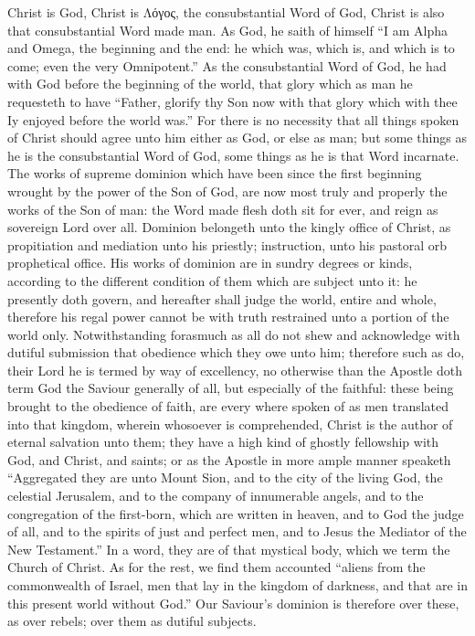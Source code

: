 Christ is God, Christ is Λόγος, the consubstantial Word of God, Christ is also that consubstantial Word made man.  As God, he saith of himself “I am Alpha and Omega, the beginning and the end: he which was, which is, and which is to come; even the very Omnipotent.” As the consubstantial Word of God, he had with God before the beginning of the world, that glory which as man he requesteth to have “Father, glorify thy Son now with that glory which with thee Iy enjoyed before the world was.” For there is no necessity that all things spoken of Christ should agree unto him either as God, or else as man; but some things as he is the consubstantial Word of God, some things as he is that Word incarnate. The works of supreme dominion which have been since the first beginning wrought by the power of the Son of God, are now most truly and properly the works of the Son of man: the Word made flesh doth sit for ever, and reign as sovereign Lord over all. Dominion belongeth unto the kingly office of Christ, as propitiation and mediation unto his priestly; instruction, unto his pastoral orb prophetical office. His works of dominion are in sundry degrees or kinds, according to the different condition of them which are subject unto it: he presently doth govern, and hereafter shall judge the world, entire and whole, therefore his regal power cannot be with truth restrained unto a portion of the world only. Notwithstanding forasmuch as all do not shew and acknowledge with dutiful submission that obedience which they owe unto him; therefore such as do, their Lord he is termed by way of excellency, no otherwise than the Apostle doth term God the Saviour generally of all, but especially of the faithful: these being brought to the obedience of faith, are every where spoken of as men translated into that kingdom, wherein whosoever is comprehended, Christ is the author of eternal salvation unto them; they have a high kind of ghostly fellowship with God, and Christ, and saints; or as the Apostle in more ample manner speaketh “Aggregated they are unto  Mount Sion, and to the city of the living God, the celestial Jerusalem, and to the company of innumerable angels, and to the congregation of the first-born, which are written in heaven, and to God the judge of all, and to the spirits of just and perfect men, and to Jesus the Mediator of the New Testament.” In a word, they are of that mystical body, which we term the Church of Christ. As for the rest, we find them accounted “aliens from the commonwealth of Israel, men that lay in the kingdom of darkness, and that are in this present world without God.” Our Saviour’s dominion is therefore over these, as over rebels; over them as dutiful subjects.

